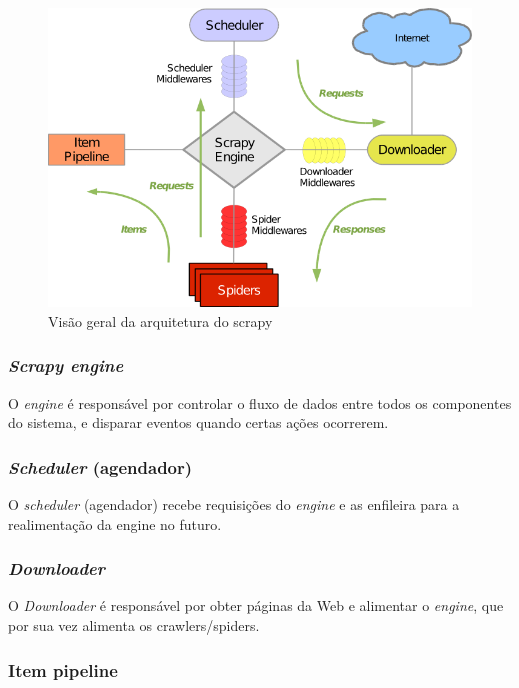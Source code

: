 \begin{figure} [ht]
	\centering
	\includegraphics[scale=1]{scrapy_architecture.png}
	\caption{Visão geral da arquitetura do scrapy \cite{scrapy_arch}}
	\label{scrapy_architecture}
\end{figure}

\subsubsection{\emph{Scrapy engine}}

O \emph{engine} é responsável por controlar o fluxo de dados entre todos os componentes do sistema, e disparar eventos quando certas ações ocorrerem.

\subsubsection{\emph{Scheduler} (agendador)}

O \emph{scheduler} (agendador) recebe requisições do \emph{engine} e as enfileira para a realimentação da engine no futuro.

\subsubsection{\emph{Downloader}}

O \emph{Downloader} é responsável por obter páginas da Web e alimentar o \emph{engine}, que por sua vez alimenta os crawlers/spiders.

\subsubsection{Item pipeline}

